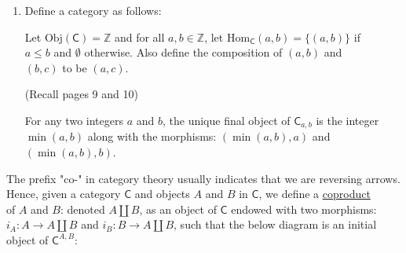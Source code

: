 \documentclass{book}
\newcommand{\hOne}{%
   \color{Black}%
   \fontsize{14}{16}\selectfont%
}
\newcommand{\exP}{%
   \color{VioletRed}%
   \fontsize{12}{14}\selectfont%
}
\newenvironment{myIndent}{%
   \begin{adjustwidth}{2.5em}{0em}%
}{%
   \end{adjustwidth}%
}
\newenvironment{myDindent}{%
   \begin{adjustwidth}{5em}{0em}%
}{%
   \end{adjustwidth}%
}
\newcommand{\udefine}[1]{{%
   \setulcolor{Red}%
   \setul{0.14em}{0.07em}%
   \ul{#1}%
}}
\newcommand{\myObj}{\mathrm{Obj}}
\newcommand{\myHom}{\mathrm{Hom}}
\newcommand{\mcateg}[1]{{\bm{\mathsf{#1}}}}
\newcommand{\retTwo}{\hfill\bigbreak}
\begin{document}
\begin{enumerate}
{\begin{myIndent}
      Furthermore, $\sigma$ is the only morphism that works to make the above diagram\\ commute because if any element of $Z$ is mapped to $A \times B$ differently, then\\ the above diagram won't commute.\retTwo
   \end{myIndent}}

   \item Define a category as follows:
   \begin{myIndent}
      Let $\myObj(\mcateg{C}) = \mathbb{Z}$ and for all $a, b \in \mathbb{Z}$, let $\myHom_\mcateg{C}(a, b) = \{(a, b)\}$ if\\ $a \leq b$ and $\emptyset$ otherwise. Also define the composition of $(a, b)$ and\\ $(b, c)$ to be $(a, c)$.
      {\begin{myDindent}\exP
         (Recall pages 9 and 10)\retTwo
      \end{myDindent}}
   \end{myIndent}

   For any two integers $a$ and $b$, the unique final object of $\mcateg{C}_{a,b}$ is the integer\\ $\min(a, b)$ along with the morphisms: $(\min(a, b), a)$ and $(\min(a, b), b)$.
\end{enumerate}

\hOne
\newpage

The prefix "co-" in category theory usually indicates that we are reversing arrows.\\ Hence, given a category $\mcateg{C}$ and objects $A$ and $B$ in $\mcateg{C}$, we define a \udefine{coproduct}\\ of $A$ and $B$: denoted $A \amalg B$, as an object of $\mcateg{C}$ endowed with two morphisms:\\ $i_A: A \longrightarrow A \amalg B$ and $i_B: B \longrightarrow A \amalg B$, such that the below diagram is an initial object of $\mcateg{C}^{A, B}$:

{\centering
\retTwo\par}
\end{document}
